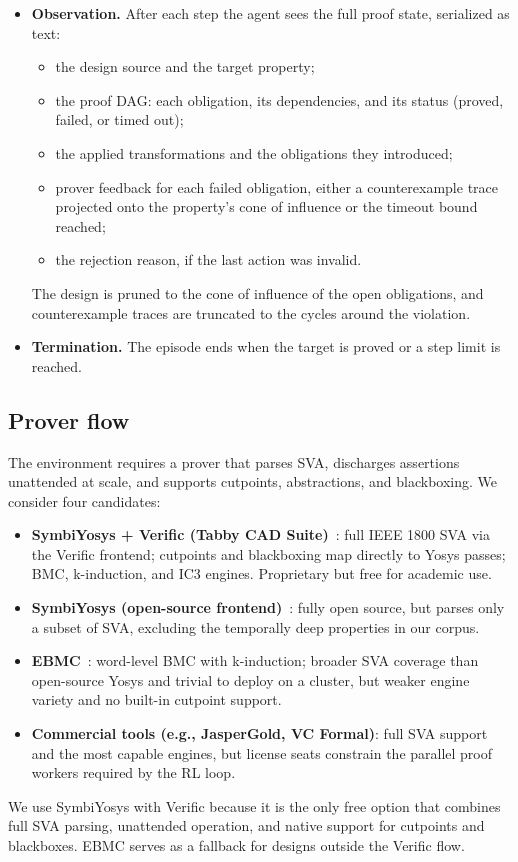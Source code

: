 \begin{itemize}[nosep]
    \item \textbf{Observation.} After each step the agent sees the full proof state,
    serialized as text:
    \begin{itemize}[nosep]
        \item the design source and the target property;
        \item the proof DAG: each obligation, its dependencies, and its status
        (proved, failed, or timed out);
        \item the applied transformations and the obligations they introduced;
        \item prover feedback for each failed obligation, either a counterexample trace
        projected onto the property's cone of influence or the timeout bound
        reached;
        \item the rejection reason, if the last action was invalid.
    \end{itemize}
    The design is pruned to the cone of influence of the open obligations, and
    counterexample traces are truncated to the cycles around the violation.

    \item \textbf{Termination.} The episode ends when the target is proved or a step limit is reached.
\end{itemize}

\subsection{Prover flow}
\label{sec:prover}

The environment requires a prover that parses SVA, discharges assertions unattended at scale, and supports cutpoints, abstractions, and blackboxing. We consider four candidates:
\begin{itemize}[nosep]
  \item \textbf{SymbiYosys + Verific (Tabby CAD Suite)}~\cite{symbiyosys}:
    full IEEE 1800 SVA via the Verific frontend; cutpoints and blackboxing map
    directly to Yosys passes; BMC, k-induction, and IC3 engines. Proprietary
    but free for academic use.
  \item \textbf{SymbiYosys (open-source frontend)}~\cite{symbiyosys}: fully
    open source, but parses only a subset of SVA, excluding the temporally
    deep properties in our corpus.
  \item \textbf{EBMC}~\cite{ebmc}: word-level BMC with k-induction; broader
    SVA coverage than open-source Yosys and trivial to deploy on a cluster,
    but weaker engine variety and no built-in cutpoint support.
  \item \textbf{Commercial tools (e.g., JasperGold, VC Formal)}: full SVA
    support and the most capable engines, but license seats constrain the
    parallel proof workers required by the RL loop.
\end{itemize}
We use SymbiYosys with Verific because it is the only free option that combines full SVA parsing, unattended operation, and native support for cutpoints and blackboxes. EBMC serves as a fallback for designs outside the Verific flow.

